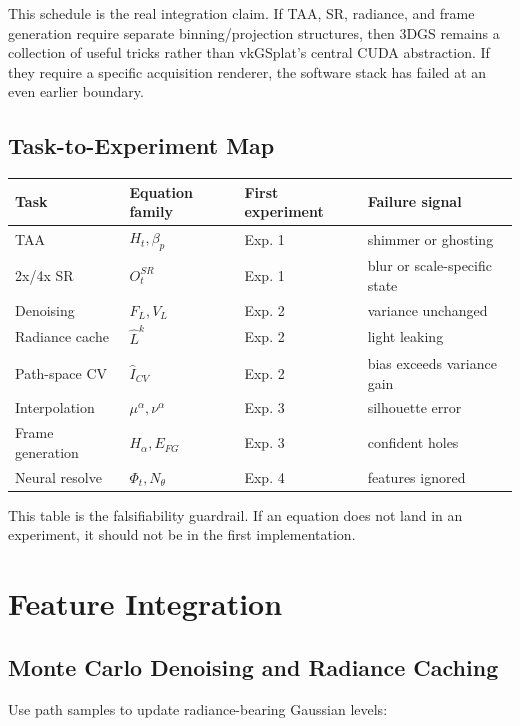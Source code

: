 \documentclass[11pt]{article}
\begin{document}
This schedule is the real integration claim. If TAA, SR, radiance, and frame
generation require separate binning/projection structures, then 3DGS remains a
collection of useful tricks rather than vkGSplat's central CUDA abstraction. If
they require a specific acquisition renderer, the software stack has failed at
an even earlier boundary.

\subsection{Task-to-Experiment Map}

\begin{center}
\begin{tabular}{llll}
\toprule
Task & Equation family & First experiment & Failure signal \\
\midrule
TAA & $H_t,\beta_p$ & Exp. 1 & shimmer or ghosting \\
2x/4x SR & $O_t^{SR}$ & Exp. 1 & blur or scale-specific state \\
Denoising & $F_L,V_L$ & Exp. 2 & variance unchanged \\
Radiance cache & $\hat{L}^k$ & Exp. 2 & light leaking \\
Path-space CV & $\hat{I}_{CV}$ & Exp. 2 & bias exceeds variance gain \\
Interpolation & $\mu^\alpha,\nu^\alpha$ & Exp. 3 & silhouette error \\
Frame generation & $H_{\alpha},E_{FG}$ & Exp. 3 & confident holes \\
Neural resolve & $\Phi_t,N_\theta$ & Exp. 4 & features ignored \\
\bottomrule
\end{tabular}
\end{center}

This table is the falsifiability guardrail. If an equation does not land in an
experiment, it should not be in the first implementation.

\section{Feature Integration}

\subsection{Monte Carlo Denoising and Radiance Caching}

Use path samples to update radiance-bearing Gaussian levels:
\end{document}
